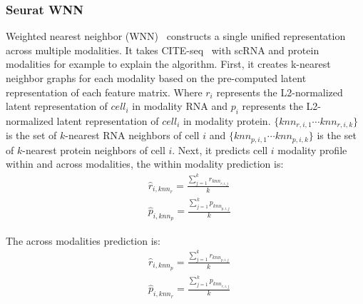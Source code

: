 \subsubsection{Seurat WNN}
Weighted nearest neighbor (WNN)~\citep{hao2021seurat4} constructs a single unified representation across multiple modalities. It takes CITE-seq~\cite{citeseq2017} with scRNA and protein modalities for example to explain the algorithm. First, it creates k-nearest neighbor graphs for each modality based on the pre-computed latent representation of each feature matrix. Where $r_i$ represents the L2-normalized latent representation of $cell_i$ in modality RNA and $p_i$ represents the L2-normalized latent representation of $cell_i$ in modality protein. $\{knn_{r,i,1}\cdots knn_{r,i,k}\}$ is the set of $k$-nearest RNA neighbors of cell $i$ and $\{knn_{p,i,1}\cdots knn_{p,i,k}\}$ is the set of $k$-nearest protein neighbors of cell $i$. Next, it predicts cell $i$ modality profile within and across modalities, the within modality prediction is:
\begin{equation}
	\begin{aligned}
		&\hat{r}_{i, knn_r}=\frac{\sum_{j=1}^{k} r_{k n n_{r, i, j}}}{k} \\
		&\hat{p}_{i, knn_p}=\frac{\sum_{j=1}^{k} p_{k n n_{p, i, j}}}{k} 
	\end{aligned}
\end{equation}

The across modalities prediction is:
\begin{equation}
	\begin{aligned}
		&\hat{r}_{i, knn_p}=\frac{\sum_{j=1}^{k} r_{k n n_{p, i, j}}}{k} \\
		&\hat{p}_{i, knn_r}=\frac{\sum_{j=1}^{k} p_{k n n_{r, i, j}}}{k}
	\end{aligned}
\end{equation}

